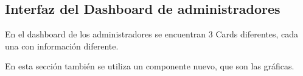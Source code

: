 \subsection{Interfaz del Dashboard de administradores}
En el dashboard de los administradores se encuentran 3 Cards diferentes, cada una con información diferente.

En esta sección también se utiliza un componente nuevo, que son las gráficas.
    
    
    